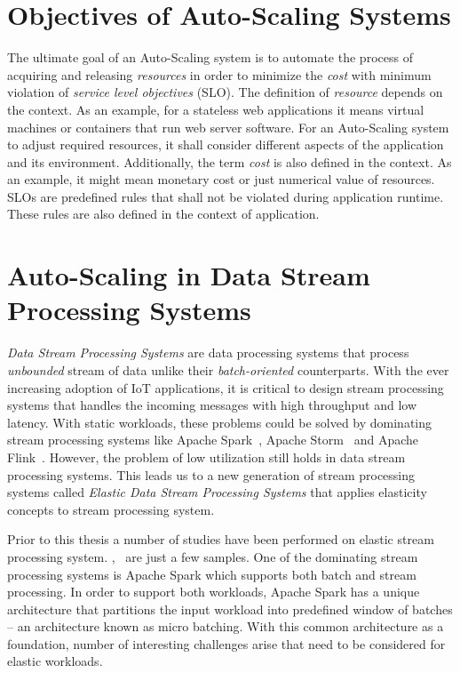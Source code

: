\section{Objectives of Auto-Scaling Systems}
The ultimate goal of an Auto-Scaling system is to automate the process of acquiring and releasing \emph{resources} in order to minimize the \emph{cost} with minimum violation of \emph{service level objectives} (SLO). The definition of \emph{resource} depends on the context. As an example, for a stateless web applications it means virtual machines or containers that run web server software. For an Auto-Scaling system to adjust required resources, it shall consider different aspects of the application and its environment. Additionally, the term \emph{cost} is also defined in the context. As an example, it might mean monetary cost or just numerical value of resources. SLOs are predefined rules that shall not be violated during application runtime. These rules are also defined in the context of application.

\section{Auto-Scaling in Data Stream Processing Systems}
\emph{Data Stream Processing Systems} are data processing systems that process \emph{unbounded} stream of data unlike their \emph{batch-oriented} counterparts. With the ever increasing adoption of IoT applications, it is critical to design stream processing systems that handles the incoming messages with high throughput and low latency. With static workloads, these problems could be solved by dominating stream processing systems like Apache Spark~\cite{spark}, Apache Storm~\cite{Storm} and Apache Flink~\cite{flink}. However, the problem of low utilization still holds in data stream processing systems. This leads us to a new generation of stream processing systems called \emph{Elastic Data Stream Processing Systems} that applies elasticity concepts to stream processing system.

Prior to this thesis a number of studies have been performed on elastic stream processing system. \cite{CastroFernandez:2013},~\cite{Heinze:2014} are just a few samples. One of the dominating stream processing systems is Apache Spark which supports both batch and stream processing. In order to support both workloads, Apache Spark has a unique architecture that partitions the input workload into predefined window of batches -- an architecture known as micro batching. With this common architecture as a foundation, number of interesting challenges arise that need to be considered for elastic workloads.

